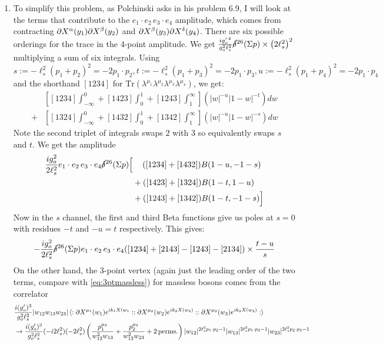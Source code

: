 \documentclass[11pt, class=article, crop=false]{standalone}
\begin{document}
\begin{enumerate}
	
	\item To simplify this problem, as Polchinski asks in his problem 6.9, I will look at the terms that contribute to the $e_1 \cdot e_2 \, e_3 \cdot e_4$ amplitude, which comes from contracting $\partial X^\alpha(y_1) \partial X^\beta(y_2)$ and $\partial X^\beta(y_3) \partial X^\delta(y_4)$. There are six possible orderings for the trace in the 4-point amplitude. We get $\frac{i {g_o'}^4}{g_o^2 \ell_s^2}  \cancel\delta^{26}(\Sigma p) \times \left(2 \ell_s^2 \right)^2$ multiplying a sum of six integrals. Using $s := - \ell_s^2 (p_1 + p_2)^2 = -2 p_1 \cdot p_2, t := - \ell_s^2 (p_1 + p_3)^2 = - 2 p_1 \cdot p_3, u := - \ell_s^2 (p_1 + p_4)^2 = - 2 p_1 \cdot p_4$ and the shorthand $[1234]$ for $\mathrm{Tr}(\lambda^{\mu_1} \lambda^{\mu_2} \lambda^{\mu_3} \lambda^{\mu_4})$, we get:
	\[
	\begin{aligned}
		& \left[[1234] \int_{-\infty}^0
		 + [1423] \int_0^1 + [1243] \int_1^\infty \right] (|w|^{-u} |1-w|^{-t}) dw \\
		+ & \left[[1324] \int_{-\infty}^0 + [1432] \int_0^1 + [1342] \int_1^\infty \right] (|w|^{- u} |1-w|^{-s}) dw
	\end{aligned}
	\]
	Note the second triplet of integrals swaps $2$ with $3$ so equivalently swaps $s$ and $t$. We get the amplitude 
	\[
	\begin{aligned}
		\frac{i g_o^2}{2 \ell_s^2} e_1 \cdot e_2\, e_3 \cdot e_4 \cancel\delta^{26} (\Sigma p) \Big[& \, \quad ([1234] + [1432]) B(1 -  u, -1 - s)\\
		& + ([1423] + [1324]) B(1 -  t, 1 - u)\\
		& + ([1243] + [1342]) B(1 -  t, -1 -  s) \Big]
	\end{aligned}
	\]
	Now in the $s$ channel, the first and third Beta functions give us poles at $s = 0$ with residues $-t$ and $-u = t$ respectively. This gives:
	\begin{equation}\label{eq:4ptgauge}
		-\frac{i g_o^2}{2 \ell_s^2} \cancel\delta^{26} (\Sigma p) e_1 \cdot e_2 \, e_3 \cdot e_4 ([1234] + [2143] - [1243] - [2134]) \times \frac{t-u}{s}
	\end{equation}
	On the other hand, the 3-point vertex (again just the leading order of the two terms, compare with \eqref{eq:3ptmassless}) for massless bosons comes from the correlator 
	\[
	\begin{aligned}
		&\frac{i (g_o')^3}{g_o^2 \ell_s^2} |w_{12} w_{13} w_{23}| \braket{:\d X^{\mu_1}(w_1) e^{i k_1 X(w_1}: :\d X^{\mu_2}(w_2) e^{i k_2 X(w_2)}: :\d X^{\mu_3}(w_3) e^{i k_3 X(w_3)}:}\\
		&\to \frac{i (g'_o)^3}{g_o^2 \ell_s^2} (-i 2 \ell_s^2) (-2 \ell_s^2) \left( \frac{p_1^{\mu_3}}{w_{12}^2 w_{13}} + \frac{p_2^{\mu_3}}{w_{12}^2 w_{23}} + 2 \perms \right) |w_{12}|^{2 \ell_s^2 p_1 \cdot p_2- 1} | w_{13}|^{2 \ell_s^2 p_1 \cdot p_3 - 1} | w_{23}|^{2 \ell_s^2 p_2 \cdot p_3 - 1} \\

\end{aligned}\]
\end{enumerate}
\end{document}
